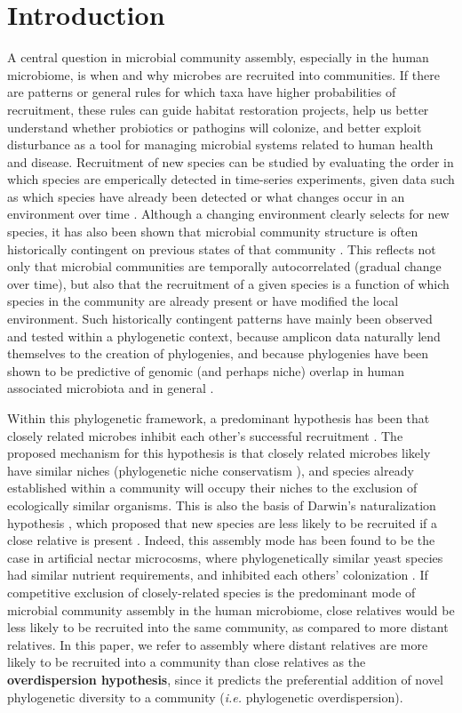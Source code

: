 \documentclass{article}
\begin{document}
{\parindent0pt \section{Introduction}}
A central question in microbial community assembly, especially in the human microbiome,  is when and why microbes are recruited into communities. If there are patterns or general rules for which taxa have higher probabilities of recruitment, these rules can guide habitat restoration projects, help us better understand whether probiotics or pathogins will colonize, and better exploit disturbance as a tool for managing microbial systems related to human health and disease.  Recruitment of new species can be studied by evaluating the order in which species are emperically detected in time-series experiments, given data such as which species have already been detected or what changes occur in an environment over time \cite{Nemergut2013,Sprockett2018}. Although a changing environment clearly selects for new species, it has also been shown that microbial community structure is often historically contingent on previous states of that community \cite{Nemergut2013,Fukami2015,Sprockett2018,Verster2018,Litvak2019}. This reflects not only that microbial communities are temporally autocorrelated (gradual change over time), but also that the recruitment of a given species is a function of which species in the community are already present or have modified the local environment. Such historically contingent patterns have mainly been observed and tested within a phylogenetic context, because amplicon data naturally lend themselves to the creation of phylogenies, and because phylogenies have been shown to be predictive of genomic (and perhaps niche) overlap in human associated microbiota \cite{Zaneveld2010,Langille2013} and in general \cite{Wiens2010,Pyron2015}.
\par
Within this phylogenetic framework, a predominant hypothesis has been that closely related microbes inhibit each other’s successful recruitment \cite{Nemergut2013,Fukami2015,Verster2018}. The proposed mechanism for this hypothesis is that closely related microbes likely have similar niches (phylogenetic niche conservatism \cite{Losos2008,Wiens2010,Pyron2015}), and species already established within a community will occupy their niches to the exclusion of ecologically similar organisms. This is also the basis of Darwin’s naturalization hypothesis \cite{Darwin1859}, which proposed that new species are less likely to be recruited if a close relative is present \cite{Ma2016}. Indeed, this assembly mode has been found to be the case in artificial nectar microcosms, where phylogenetically similar yeast species had similar nutrient requirements, and inhibited each others’ colonization \cite{Peay2012}. If competitive exclusion of closely-related species is the predominant mode of microbial community assembly in the human microbiome, close relatives would be less likely to be recruited into the same community, as compared to more distant relatives. In this paper, we refer to assembly where distant relatives are more likely to be recruited into a community than close relatives as the \textbf{overdispersion hypothesis}, since it predicts the preferential addition of novel phylogenetic diversity to a community (\emph{i.e.} phylogenetic overdispersion).
\end{document}

